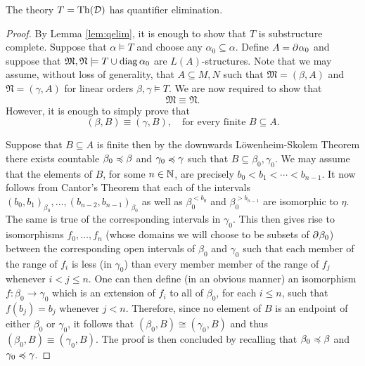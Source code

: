 \begin{thm}
	The theory $T=\operatorname{Th}(\mathcal{D})$ has quantifier elimination.
\end{thm}
\begin{proof}
	By Lemma \ref{lem:qelim}, it is enough to show that $T$ is substructure complete.  Suppose that $\alpha\models T$ and choose any $\alpha_0\subseteq\alpha$.  Define $A=\partial^{}{}\alpha_0$ and suppose that $\mathfrak{M},\mathfrak{N}\models T\cup\operatorname{diag}{\alpha_0}$ are $L(A)$-structures.  Note that we may assume, without loss of generality, that $A\subseteq M,N$ such that $\mathfrak{M}=(\beta,A)$ and $\mathfrak{N}=(\gamma,A)$ for linear orders $\beta,\gamma\models T$.  We are now required to show that
	\begin{equation}
		\mathfrak{M}\equiv\mathfrak{N}.
	\end{equation}
	However, it is enough to simply prove that
	\begin{equation}
		(\beta,B)\equiv(\gamma,B),\quad\text{for every finite }B\subseteq A.
	\end{equation}

	Suppose that $B\subseteq A$ is finite then by the downwards
	L\"owenheim-Skolem Theorem there exists countable $\beta_0\preccurlyeq\beta$ and
	$\gamma_0\preccurlyeq\gamma$ such that $B\subseteq\beta_0,\gamma_0$.  We may assume
	that the elements of $B$, for some $n\in\mathbb{N}$, are precisely
	$b_0<b_1<\dotsb<b_{n-1}$.  It now follows from Cantor's Theorem that each of the
	intervals $(b_0,b_1)_{\beta_0},\dotsc,(b_{n-2},b_{n-1})_{\beta_0}$ as well as
	$\beta_0^{<b_0}$ and $\beta_0^{>b_{n-1}}$ are isomorphic to $\eta$.  The same is
	true of the corresponding intervals in $\gamma_0$.  This then gives rise to
	isomorphisms $f_0,\dotsc,f_n$ (whose domains we will choose to be subsets of
	$\partial^{}{}\beta_0$) between the corresponding open intervals of $\beta_0$ and
	$\gamma_0$ such that each member of the range of $f_i$ is less (in $\gamma_0$)
	than every member member of the range of $f_j$ whenever $i<j\leq n$.  One can
	then define (in an obvious manner) an isomorphism $f\colon\beta_0\to\gamma_0$
	which is an extension of $f_i$ to all of $\beta_0$, for each $i\leq n$, such
	that $f(b_j)=b_j$ whenever $j<n$.  Therefore, since no element of $B$ is an
	endpoint of either $\beta_0$ or $\gamma_0$, it follows that
	$(\beta_0,B)\cong(\gamma_0,B)$ and thus $(\beta_0,B)\equiv(\gamma_0,B)$.  The
	proof is then concluded by recalling that $\beta_0\preccurlyeq\beta$ and
	$\gamma_0\preccurlyeq\gamma$.
\end{proof}

